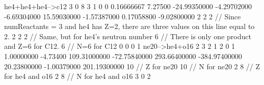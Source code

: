 \begin{DoxyCode}
he4+he4+he4-->c12 3 0 8 3 1 0 0 0.16666667 7.27500
-24.99350000 -4.29702000 -6.69304000 15.59030000 -1.57387000 0.17058800 -9.02800000
2 2 2 // Since numReactants = 3 and he4 has Z=2, there are three values on this line equal to 2.
2 2 2 // Same, but for he4's neutron number
6 // There is only one product and Z=6 for C12.
6 // N=6 for C12
0 0 0 
1 
ne20-->he4+o16 2 3 2 1 2 0 1 1.00000000 -4.73400
109.31000000 -72.75840000 293.66400000 -384.97400000 20.23800000 -1.00379000 201.19300000
10 // Z for ne20
10 // N for ne20
2 8 // Z for he4 and o16
2 8 // N for he4 and o16
3 
0 2 
\end{DoxyCode}
 